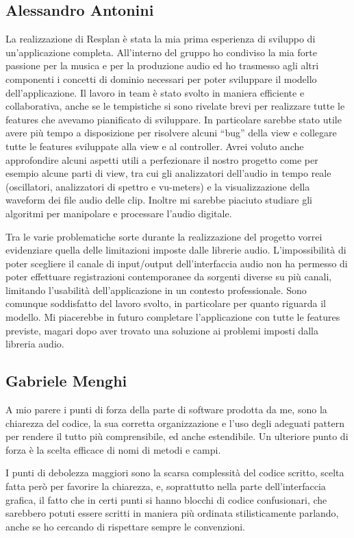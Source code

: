 \documentclass[a4paper,12pt]{report}
\begin{document}
\subsection{Alessandro Antonini}
La realizzazione di Resplan è stata la mia prima esperienza di sviluppo di un'applicazione completa. All’interno del gruppo ho condiviso la mia forte passione per la musica e per la produzione audio ed ho trasmesso agli altri componenti i concetti di dominio necessari per poter sviluppare il modello dell’applicazione.
Il lavoro in team è stato svolto in maniera efficiente e collaborativa, anche se le tempistiche si sono rivelate brevi per realizzare tutte le features che avevamo pianificato di sviluppare. In particolare sarebbe stato utile avere più tempo a disposizione per risolvere alcuni “bug” della view e collegare tutte le features sviluppate alla view e al controller.
Avrei voluto anche approfondire alcuni aspetti utili a perfezionare il nostro progetto come per esempio alcune parti di view, tra cui gli analizzatori dell’audio in tempo reale (oscillatori, analizzatori di spettro e vu-meters) e la visualizzazione della waveform dei file audio delle clip. Inoltre mi sarebbe piaciuto studiare gli algoritmi per manipolare e processare l’audio digitale.

Tra le varie problematiche sorte durante la realizzazione del progetto vorrei evidenziare quella delle limitazioni imposte dalle librerie audio. L’impossibilità di poter scegliere il canale di input/output dell’interfaccia audio non ha permesso di poter effettuare registrazioni contemporanee da sorgenti diverse su più canali, limitando l’usabilità dell’applicazione in un contesto professionale.
Sono comunque soddisfatto del lavoro svolto, in particolare per quanto riguarda il modello. 
Mi piacerebbe in futuro completare l’applicazione con tutte le features previste, magari dopo aver trovato una soluzione ai problemi imposti dalla libreria audio.
\endsubsection
\subsection{Gabriele Menghi}
A mio parere i punti di forza della parte di software prodotta da me, sono la chiarezza del codice, la sua corretta organizzazione e l’uso degli adeguati pattern per rendere il tutto più comprensibile, ed anche estendibile. Un ulteriore punto di forza è la scelta efficace di nomi di metodi e campi. 

I punti di debolezza maggiori sono la scarsa complessità del codice scritto, scelta fatta però per favorire la chiarezza, e, soprattutto nella parte dell’interfaccia grafica, il fatto che in certi punti si hanno blocchi di codice confusionari, che sarebbero potuti essere scritti in maniera più ordinata stilisticamente parlando, anche se ho cercando di rispettare sempre le convenzioni.
\end{document}
